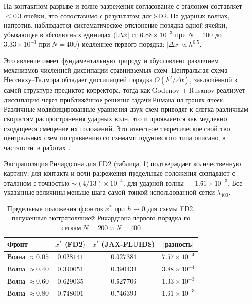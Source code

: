 \documentclass[a4paper,14pt]{extarticle}
\theoremstyle{theorem}
\theoremstyle{lemma}
\begin{document}
На контактном разрыве и волне разрежения согласование с эталоном составляет $\le 0.3$ ячейки, что сопоставимо с результатом для SD2. На ударных волнах, напротив, наблюдается систематическое отклонение порядка одной ячейки, убывающее в абсолютных единицах ($|\Delta x|$ от $6.88 \times 10^{-3}$ при $N=100$ до $3.33 \times 10^{-3}$ при $N=400$) медленнее первого порядка: $|\Delta x| \propto h^{0.5}$.

Это явление имеет фундаментальную природу и обусловлено различием механизмов численной диссипации сравниваемых схем. Центральная схема Нессияху--Тадмора обладает диссипацией порядка $O(h^2 / \Delta t)$, заключённой в самой структуре предиктор-корректора, тогда как Godunov + Rusanov реализует диссипацию через приближённое решение задачи Римана на гранях ячеек. Различные модифицированные уравнения двух схем приводят к слегка различным скоростям распространения ударных волн, что и проявляется как медленно сходящееся смещение их положений. Это известное теоретическое свойство центральных схем по сравнению со схемами годуновского типа описано, в частности, в работах~\cite{toro,kurganov2000}.

Экстраполяция Ричардсона для FD2 (таблица~\ref{tab:richardson_fd2}) подтверждает количественную картину: для контакта и волн разрежения предельные положения совпадают с эталоном с точностью $\sim (4 / 13) \times 10^{-4}$, для ударной волны --- $1.61 \times 10^{-3}$. Все указанные величины меньше шага самой тонкой использованной сетки $h_{400}$.

\begin{table}[!htbp]
    \centering
    \caption{Предельные положения фронтов $x^*$ при $h \to 0$ для схемы FD2, полученные экстраполяцией Ричардсона первого порядка по сеткам $N=200$ и $N=400$}
    \vspace{0.1cm}
    \label{tab:richardson_fd2}
    \begin{tabular}{lccc}
        \toprule
        Фронт & $x^*$ (FD2) & $x^*$ (JAX-FLUIDS) & $|$разность$|$ \\
        \midrule
        Волна $\approx 0.05$ & $0.028141$ & $0.027384$ & $7.57 \times 10^{-4}$ \\
        Волна $\approx 0.40$ & $0.390051$ & $0.390439$ & $3.88 \times 10^{-4}$ \\
        Волна $\approx 0.60$ & $0.629035$ & $0.627706$ & $1.33 \times 10^{-3}$ \\
        Волна $\approx 0.80$ & $0.748001$ & $0.746393$ & $1.61 \times 10^{-3}$ \\
        \bottomrule
    \end{tabular}
\end{table}
\end{document}
